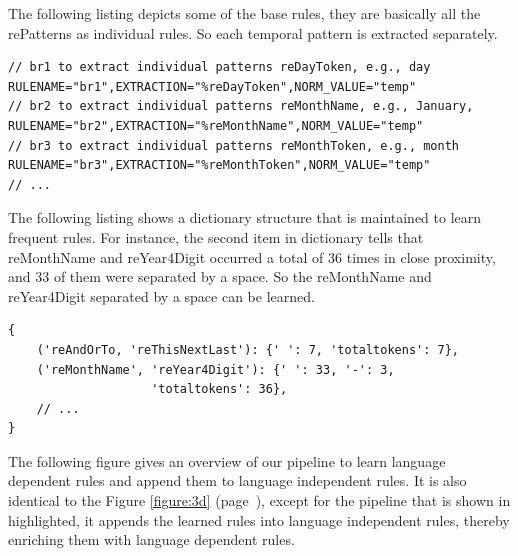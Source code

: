 The following listing depicts some of the base rules, they are basically all the rePatterns as individual rules. So each temporal pattern is extracted separately.\\

\begin{minipage}{\linewidth}
\begin{lstlisting}
// br1 to extract individual patterns reDayToken, e.g., day 
RULENAME="br1",EXTRACTION="%reDayToken",NORM_VALUE="temp"
// br2 to extract individual patterns reMonthName, e.g., January, 
RULENAME="br2",EXTRACTION="%reMonthName",NORM_VALUE="temp"
// br3 to extract individual patterns reMonthToken, e.g., month 
RULENAME="br3",EXTRACTION="%reMonthToken",NORM_VALUE="temp"
// ...
\end{lstlisting}
\end{minipage}


The following listing shows a dictionary structure that is maintained to learn frequent rules. For instance, the second item in dictionary tells that reMonthName and reYear4Digit occurred a total of 36 times in close proximity, and 33 of them were separated by a space. So the reMonthName and reYear4Digit separated by a space can be learned.\\

\begin{minipage}{\linewidth}
\begin{lstlisting}
{
	('reAndOrTo, 'reThisNextLast'): {' ': 7, 'totaltokens': 7},
	('reMonthName', 'reYear4Digit'): {' ': 33, '-': 3, 
					'totaltokens': 36},
	// ...
}
\end{lstlisting}
\end{minipage}

The following figure gives an overview of our pipeline to learn language dependent rules and append them to language independent rules. It is also identical to the Figure \ref{figure:3d} (page~\pageref{figure:3d}), except for the pipeline that is shown in highlighted, it appends the learned rules into language independent rules, thereby enriching them with language dependent rules.

